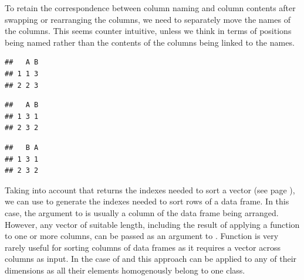 \documentclass[krantz2]{krantz}\usepackage{knitr}
\begin{document}
To retain the correspondence between column naming and column contents after swapping or rearranging the columns, we need to separately move the names of the columns. This seems counter intuitive, unless we think in terms of positions being named rather than the contents of the columns being linked to the names.

\begin{knitrout}\footnotesize
{}\color{fgcolor}\begin{kframe}
\begin{alltt}
 \hlkwb{<-} \hlstd{(} \hlstd{=} \hlopt{:}\hlstd{,}  \hlstd{=} \hlstd{)}
 \hlstd{)}
\end{alltt}
\begin{verbatim}
##   A B
## 1 1 3
## 2 2 3
\end{verbatim}
\begin{alltt}
\hlstd{my_data_frame.df[ ,} \hlopt{:}\hlstd{]} \hlkwb{<-} \hlstd{my_data_frame.df[ ,} \hlopt{:}\hlstd{]}
 \hlstd{)}
\end{alltt}
\begin{verbatim}
##   A B
## 1 3 1
## 2 3 2
\end{verbatim}
\begin{alltt}
\hlstd{(my_data_frame.df)[}\hlopt{:}\hlstd{]} \hlkwb{<-} \hlstd{(my_data_frame.df)[}\hlopt{:}\hlstd{]}
 \hlstd{)}
\end{alltt}
\begin{verbatim}
##   B A
## 1 3 1
## 2 3 2
\end{verbatim}
\end{kframe}
\end{knitrout}

Taking into account that  returns the indexes needed to sort a vector (see page \pageref{box:vec:sort}), we can use  to generate the indexes needed to sort rows of a data frame. In this case, the argument to  is usually a column of the data frame being arranged. However, any vector of suitable length, including the result of applying a function to one or more columns, can be passed as an argument to . Function  is very rarely useful for sorting columns of data frames as it requires a vector across columns as input. In the case of  and  this approach can be applied to any of their dimensions as all their elements homogenously belong to one class.
\end{document}

